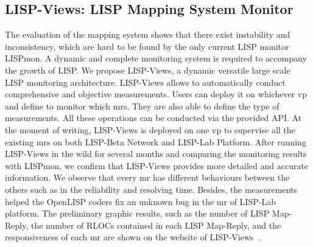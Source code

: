 \subsection{LISP-Views: LISP Mapping System Monitor}
The evaluation of the mapping system shows that there exist instability and inconsistency, which are hard to be found by the only current LISP monitor LISPmon. A dynamic and complete monitoring system is required to accompany the growth of LISP. We propose LISP-Views, a dynamic versatile large scale LISP monitoring architecture. LISP-Views allows to automatically conduct comprehensive and objective measurements. Users can deploy it on whichever \acrshort{vp} and define to monitor which \acrshort{mr}s. They are also able to define the type of measurements. All these operations can be conducted via the provided API. At the moment of writing, LISP-Views is deployed on one \acrshort{vp} to supervise all the existing \acrshort{mr}s on both LISP-Beta Network and LISP-Lab Platform. After running LISP-Views in the wild for several months and comparing the monitoring results with LISPmon, we confirm that LISP-Views provides more detailed and accurate information. We observe that every \acrshort{mr} has different behaviours between the others such as in the reliability and resolving time. Besides, the measurements helped the OpenLISP coders fix an unknown bug in the \acrshort{mr} of LISP-Lab platform. The preliminary graphic results, such as the number of LISP Map-Reply, the number of RLOCs contained in each LISP Map-Reply, and the responsiveness of each \acrshort{mr} are shown on the website of LISP-Views~\cite{lispviews}.

